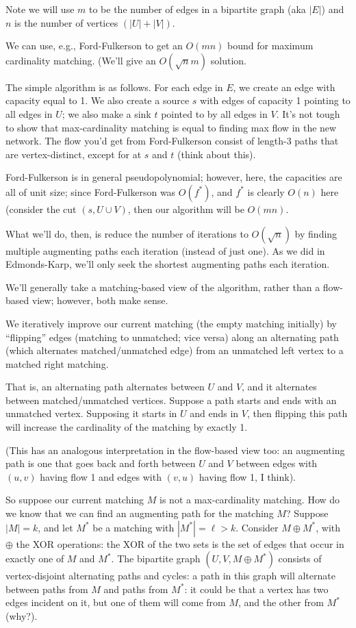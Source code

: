 \documentclass{article}
\begin{document}
Note we will use $m$ to be the number of edges in a bipartite graph (aka $|E|$)
and $n$ is the number of vertices $(|U| + |V|)$.

We can use, e.g., Ford-Fulkerson to get an $O(mn)$ bound for
maximum cardinality matching.
(We'll give an $O(\sqrt n m)$ solution.

The simple algorithm is as follows.
For each edge in $E$, we create an edge with capacity equal to 1.
We also create a source $s$ with edges of capacity 1 pointing to all edges
in $U$; we also make a sink $t$ pointed to by all edges in $V$.
It's not tough to show that max-cardinality matching is equal to finding
max flow in the new network.
The flow you'd get from Ford-Fulkerson consist of length-3 paths
that are vertex-distinct, except for at $s$ and $t$ (think about this).

Ford-Fulkerson is in general pseudopolynomial; however, here, the capacities
are all of unit size; since Ford-Fulkerson was $O(f^*)$, and $f^*$ is 
clearly $O(n)$ here (consider the cut $(s, U \cup V)$, then our algorithm will be $O(mn)$.

What we'll do, then, is reduce the number of iterations to $O(\sqrt n)$ by
finding multiple augmenting paths each iteration (instead of just one).
As we did in Edmonds-Karp, we'll only seek the shortest augmenting paths
each iteration.

We'll generally take a matching-based view of the algorithm, rather
than a flow-based view; however, both make sense.

We iteratively improve our current matching (the empty matching
initially) by ``flipping'' edges (matching to unmatched; vice versa)
along an alternating path (which alternates matched/unmatched edge)
from an unmatched left vertex to a matched right matching.

That is, an alternating path alternates between $U$ and $V$, and it 
alternates between matched/unmatched vertices.
Suppose a path starts and ends with an unmatched vertex. Supposing
it starts in $U$ and ends in $V$, then flipping this path will
increase the cardinality of the matching by exactly 1.

(This has an analogous interpretation in the flow-based view too:
an augmenting path is one that goes back and forth between $U$
and $V$ between edges with $(u,v)$ having flow 1 and edges with $(v,u)$ having
flow 1, I think).

So suppose our current matching $M$ is not a max-cardinality matching.
How do we know that we can find an augmenting path for the matching $M$?
Suppose $|M| = k$, and let $M^*$ be a matching with $|M^*| = \ell> k$.
Consider $M \oplus M^*$, with $\oplus$ the XOR operations: the XOR of the
two sets is the set of edges that occur in exactly one of $M$ and $M^*$.
The bipartite graph $(U,V,M\oplus M^*)$ consists of vertex-disjoint
alternating paths and cycles: a path in this graph will alternate
between paths from $M$ and paths from $M^*$: it could be that a vertex has
two edges incident on it, but one of them will come from $M$, and the other
from $M^*$ (why?).
\end{document}
